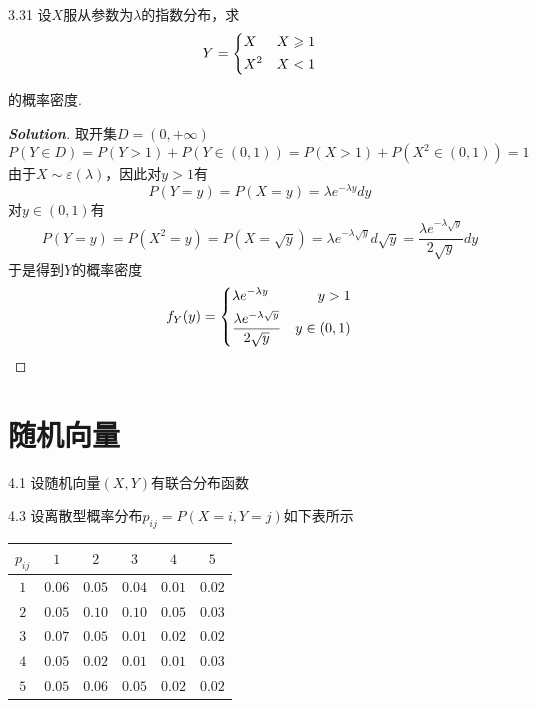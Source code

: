 \documentclass[10pt, a4paper, oneside]{ctexart}
\newenvironment{solution}{\begin{proof}[\bf Solution]}{\end{proof}}
\begin{document}
3.31 设$X$服从参数为$\lambda$的指数分布，求
\[Y = \left\{ \begin{gathered}
  X \hfill \quad X\geqslant 1\\
  {X^2} \hfill \quad  X<1\\ 
\end{gathered}  \right.\]

的概率密度.
\begin{solution}
取开集$D=(0,+\infty)$
    \[P(Y\in D)=P(Y>1)+P(Y\in (0,1))=P(X>1)+P(X^2\in (0,1))=1\]
由于$X\sim \varepsilon(\lambda)$，因此对$y>1$有
    \[P(Y = y) = P(X = y) = \lambda {e^{ - \lambda y}}dy\]
对$y\in (0,1)$有
\[P(Y = y) = P({X^2} = y) = P(X = \sqrt y ) = \lambda {e^{ - \lambda \sqrt y }}d\sqrt y  = \frac{{\lambda {e^{ - \lambda \sqrt y }}}}{{2\sqrt y }}dy\]
于是得到$Y$的概率密度
    \[{f_Y}(y) = \left\{ \begin{gathered}
  \lambda {e^{ - \lambda y}} \hfill \quad y>1\\
  \frac{{\lambda {e^{ - \lambda \sqrt y }}}}{{2\sqrt y }} \hfill \quad y\in(0,1)\\ 
\end{gathered}  \right.\]
\end{solution}

\newpage
\section{随机向量}
4.1 设随机向量$(X,Y)$有联合分布函数



4.3 设离散型概率分布$p_{ij}=P(X=i,Y=j)$如下表所示

\begin{table}[ht]
    \centering
    \begin{tabular}{|c|c|c|c|c|c|} \hline 
 $p_{ij}$&  $1$&$2$&$3$&$4$&$5$\\ \hline 
 $1$&  $0.06$&$0.05$    &$0.04$&$0.01$&$0.02$\\ \hline 
         $2$&    $0.05$&$0.10$&$0.10$&$0.05$&$0.03$\\ \hline 
         $3$& 
      $0.07$&$0.05$& $0.01$&$0.02$&$0.02$\\ \hline
 $4$& $0.05$& $0.02$& $0.01$&$0.01$&$0.03$\\\hline
 $5$& $0.05$& $0.06$& $0.05$& $0.02$&$0.02$\\\hline\end{tabular}
\end{table}
\end{document}
